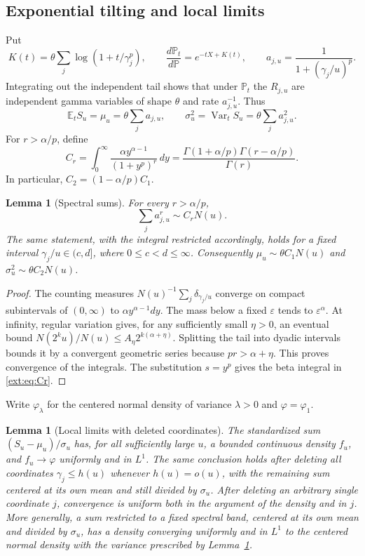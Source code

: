 \documentclass[11pt]{article}
\newtheorem{lemma}[theorem]{Lemma}
\theoremstyle{definition}
\theoremstyle{remark}
\begin{document}
\subsection{Exponential tilting and local limits}

Put
\[
 K(t)=\theta\sum_j\log(1+t/\gamma_j^p),\qquad
 \frac{d\mathbb P_t}{d\mathbb P}=e^{-tX+K(t)},\qquad
 a_{j,u}=\frac1{1+(\gamma_j/u)^p}.
\]
Integrating out the independent tail shows that under $\mathbb P_t$ the
$R_{j,u}$ are independent gamma variables of shape $\theta$ and rate
$a_{j,u}^{-1}$.  Thus
\[
 \mathbb E_tS_u=\mu_u=\theta\sum_j a_{j,u},\qquad
 \sigma_u^2=\operatorname{Var}_tS_u
             =\theta\sum_j a_{j,u}^2.
\]
For $r>\alpha/p$, define
\begin{equation}\label{ext:eq:Cr}
 C_r=\int_0^\infty
       \frac{\alpha y^{\alpha-1}}{(1+y^p)^r}\,dy
     =\frac{\Gamma(1+\alpha/p)\Gamma(r-\alpha/p)}{\Gamma(r)}.
\end{equation}
In particular, $C_2=(1-\alpha/p)C_1$.

\begin{lemma}[Spectral sums]\label{ext:lem:sums}
For every $r>\alpha/p$,
\[
 \sum_j a_{j,u}^r\sim C_rN(u).
\]
The same statement, with the integral restricted accordingly, holds for
a fixed interval $\gamma_j/u\in(c,d]$, where $0\le c<d\le\infty$.
Consequently $\mu_u\sim\theta C_1N(u)$ and
$\sigma_u^2\sim\theta C_2N(u)$.
\end{lemma}

\begin{proof}
The counting measures
$N(u)^{-1}\sum_j\delta_{\gamma_j/u}$ converge on compact subintervals of
$(0,\infty)$ to $\alpha y^{\alpha-1}dy$.  The mass below a fixed
$\varepsilon$ tends to $\varepsilon^\alpha$.  At infinity, regular
variation gives, for any sufficiently small $\eta>0$, an eventual bound
$N(2^ku)/N(u)\le A_\eta2^{k(\alpha+\eta)}$.  Splitting the tail into
dyadic intervals bounds it by a convergent geometric series because
$pr>\alpha+\eta$.  This proves convergence of the integrals.
The substitution $s=y^p$ gives the beta integral in
\eqref{ext:eq:Cr}.
\end{proof}

Write $\varphi_\lambda$ for the centered normal density of variance
$\lambda>0$ and $\varphi=\varphi_1$.

\begin{lemma}[Local limits with deleted coordinates]\label{ext:lem:llt}
The standardized sum $(S_u-\mu_u)/\sigma_u$ has, for all sufficiently
large $u$, a bounded continuous density $f_u$, and
$f_u\to\varphi$ uniformly and in $L^1$.
The same conclusion holds after deleting all coordinates
$\gamma_j\le h(u)$ whenever $h(u)=o(u)$, with the remaining sum centered
at its own mean and still divided by $\sigma_u$.
After deleting an arbitrary single coordinate $j$, convergence is
uniform both in the argument of the density and in $j$.
More generally, a sum restricted to a fixed spectral band, centered at
its own mean and divided by $\sigma_u$, has a density converging uniformly
and in $L^1$ to the centered normal density with the variance prescribed
by Lemma~\ref{ext:lem:sums}.
\end{lemma}
\end{document}
